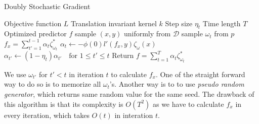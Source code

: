 \documentclass{amsart}
\theoremstyle{definition}
\theoremstyle{remark}
\numberwithin{equation}{section}
\begin{document}
\begin{algorithm}\label{DSG2}
\caption{Doubly Stochastic Gradient}
\begin{algorithmic}
\REQUIRE Objective function $L$
\REQUIRE Translation invariant kernel $k$
\REQUIRE Step size $\eta_t$
\REQUIRE Time length $T$
\ENSURE Optimized predictor $f$
\STATE sample $(x, y)$ uniformly from $\mathcal{D}$
\STATE sample $\omega_t$ from $p$
\STATE $f_x = \sum_{t'=1}^{t-1} \alpha_{t}\zeta_{\omega_{t}}^{\ast}$
\STATE $\alpha_t \leftarrow -\phi(0) l'(f_x, y)\zeta_\omega(x)$
\STATE $\alpha_{t'} \leftarrow (1-\eta_{t})\alpha_{t'} \quad \text{for $1\leq t' \leq t$}$
\ENDFOR
\STATE Return $f = \sum_{t=1}^T \alpha_{t}\zeta_{\omega_{t}}^{\ast}$
\end{algorithmic}
\end{algorithm}
We use $\omega_{t'}$ for $t'< t$ in iteration $t$ to calculate $f_x$.
One of the straight forward way to do so is to memorize all $\omega_t$'s.
Another way is to to use \textit{pseudo random generator}, which returns same random value for the same seed.
The drawback of this algorithm is that its complexity is $O(T^2)$ as we have to calculate $f_x$ in every iteration, which takes $O(t)$ in interation $t$.

\printbibliography
\end{document}
